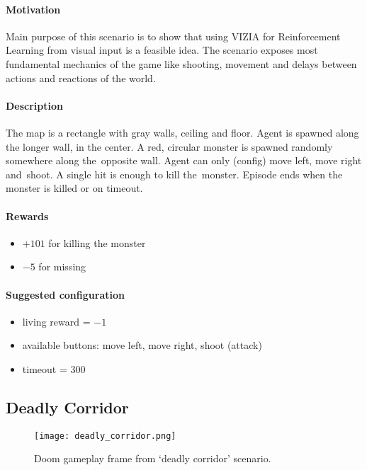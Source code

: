 		\paragraph{Motivation}
			Main purpose of this scenario is to show that using VIZIA for Reinforcement Learning from visual input is a feasible idea. The scenario exposes most fundamental mechanics of the game like shooting, movement and delays between actions and reactions of the world.
		
		\paragraph{Description}
			The map is a rectangle with gray walls, ceiling and floor. Agent is spawned along the longer wall, in the center. A red, circular monster is spawned randomly somewhere along the~opposite wall. Agent can only (config) move left, move right and~shoot. A single hit is enough to kill the~monster. Episode ends when the monster is killed or on timeout.
		
		\paragraph{Rewards}
			\begin{itemize}
				\item $+101$ for killing the monster
				\item $-5$ for missing
			\end{itemize}
		
		\paragraph{Suggested configuration}
			\begin{itemize}
				\item living reward = $-1$
				\item available buttons: move left, move right, shoot (attack)
				\item timeout = 300
			\end{itemize}
	\newpage

	\subsection{Deadly Corridor}
		\begin{figure}
			\centering
			\texttt{[image: deadly\_corridor.png]}
			\caption{Doom gameplay frame from `deadly corridor' scenario.}\label{fig:deadly_corridor}
		\end{figure}

